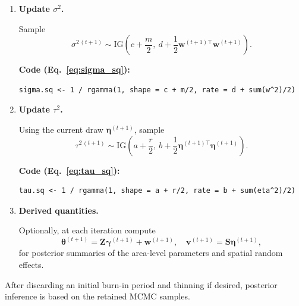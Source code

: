 \documentclass[12pt]{article}
\begin{document}
\begin{enumerate}
  \textbf{Code (Eq.~\ref{eq:var_w}--\ref{eq:mean_w}):}
\begin{verbatim}
Z_gamma <- as.numeric(Z %*% gamma)
var_w <- (d.var * sigma.sq) / (d.var + sigma.sq)
mean_w <- var_w * (y - Z_gamma) / d.var
w <- rnorm(m, mean = mean_w, sd = sqrt(var_w))
\end{verbatim}

  \item \textbf{Update $\sigma^2$.}
  
  Sample
  \[
    \sigma^{2\,(t+1)} \sim \text{IG}\left( c + \frac{m}{2}, \ d + \frac{1}{2} \mathbf{w}^{(t+1)\top} \mathbf{w}^{(t+1)} \right).
  \]

  \textbf{Code (Eq.~\ref{eq:sigma_sq}):}
\begin{verbatim}
sigma.sq <- 1 / rgamma(1, shape = c + m/2, rate = d + sum(w^2)/2)
\end{verbatim}

  \item \textbf{Update $\tau^2$.}
  
  Using the current draw $\boldsymbol{\eta}^{(t+1)}$, sample
  \[
    \tau^{2\,(t+1)} \sim \text{IG}\left( a + \frac{r}{2}, \ b + \frac{1}{2} \boldsymbol{\eta}^{(t+1)\top} \boldsymbol{\eta}^{(t+1)} \right).
  \]

  \textbf{Code (Eq.~\ref{eq:tau_sq}):}
\begin{verbatim}
tau.sq <- 1 / rgamma(1, shape = a + r/2, rate = b + sum(eta^2)/2)
\end{verbatim}

  \item \textbf{Derived quantities.}
  
  Optionally, at each iteration compute
  \[
    \boldsymbol{\theta}^{(t+1)} = \mathbf{Z} \boldsymbol{\gamma}^{(t+1)} + \mathbf{w}^{(t+1)}, \quad
    \mathbf{v}^{(t+1)} = \mathbf{S} \boldsymbol{\eta}^{(t+1)},
  \]
  for posterior summaries of the area-level parameters and spatial random effects.
\end{enumerate}

After discarding an initial burn-in period and thinning if desired, posterior inference is based on
the retained MCMC samples.
\end{document}
